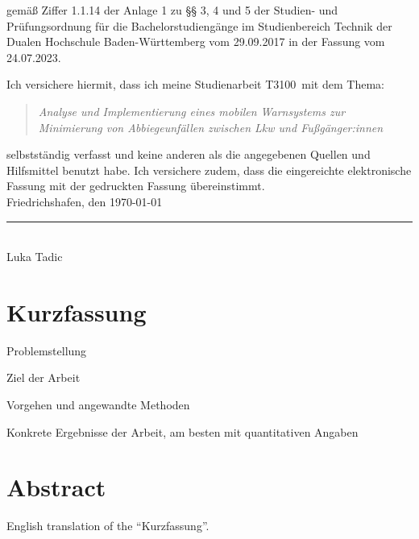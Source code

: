 \documentclass[openany]{scrbook} %
\newcommand{\titel}{Analyse und Implementierung eines mobilen Warnsystems zur Minimierung von Abbiegeunfällen zwischen Lkw und Fußgänger:innen}
\newcommand{\arbeit}{Studienarbeit T3100}
\newcommand{\autor}{Luka Tadic}
\begin{document}
gemäß Ziffer 1.1.14 der Anlage 1 zu §§ 3, 4 und 5  
der Studien- und Prüfungsordnung für die Bachelorstudiengänge im Studienbereich Technik  
der Dualen Hochschule Baden-Württemberg vom 29.09.2017 in der Fassung vom 24.07.2023.

Ich versichere hiermit, dass ich meine \arbeit\ mit dem Thema:

\begin{quote}
    \textit{\titel}
\end{quote}

selbstständig verfasst und keine anderen als die angegebenen Quellen und Hilfsmittel benutzt habe.  
Ich versichere zudem, dass die eingereichte elektronische Fassung mit der gedruckten Fassung übereinstimmt.\\[6ex]

Friedrichshafen, den \today \\[1ex]
\rule[-0.2cm]{5cm}{0.5pt} \\
\autor \\[10ex]

\rmfamily

\chapter*{Kurzfassung} %

Problemstellung

Ziel der Arbeit

Vorgehen und angewandte Methoden

Konkrete Ergebnisse der Arbeit, am besten mit quantitativen Angaben

\clearpage

\chapter*{Abstract} %

English translation of the “Kurzfassung”.

\clearpage

\end{document}
